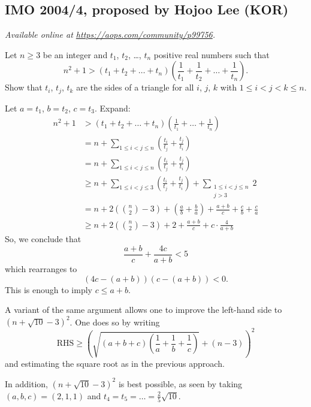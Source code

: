 \documentclass[11pt]{scrartcl}
\begin{document}
\subsection{IMO 2004/4, proposed by Hojoo Lee (KOR)}
\textsl{Available online at \url{https://aops.com/community/p99756}.}
\begin{mdframed}[style=mdpurplebox,frametitle={Problem statement}]
Let $n \ge 3$ be an integer
and $t_1$, $t_2$, \dots, $t_n$ positive real numbers such that
\[ n^2+1 > \left(t_1 + t_2 + \dots + t_n\right)
  \left( \frac{1}{t_1} + \frac{1}{t_2} + \dots + \frac{1}{t_n} \right). \]
Show that $t_i$, $t_j$, $t_k$ are the sides of a triangle
for all $i$, $j$, $k$ with $1 \le i < j < k \le n$.
\end{mdframed}
Let $a = t_1$, $b = t_2$, $c = t_3$.
Expand:
\begin{align*}
  n^2+1 &> \left(t_1 + t_2 + \dots + t_n\right)
    \left( \frac{1}{t_1} + \dots + \frac{1}{t_n} \right) \\
  &= n + \sum_{1 \le i < j \le n}
    \left( \frac{t_i}{t_j} + \frac{t_j}{t_i} \right) \\
  &= n + \sum_{1 \le i < j \le n}
    \left( \frac{t_i}{t_j} + \frac{t_j}{t_i} \right) \\
  &\ge n + \sum_{1 \le i < j \le 3}
    \left( \frac{t_i}{t_j} + \frac{t_j}{t_i} \right)
    + \sum_{\substack{1 \le i < j \le n \\ j > 3 }} 2 \\
  &= n + 2\left( \binom n2-3 \right)
    + \left( \frac ab + \frac ba \right)
    + \frac{a+b}{c} + \frac{c}{b} + \frac{c}{a} \\
  &\ge n + 2\left( \binom n2-3 \right) + 2
    + \frac{a+b}{c} + c \cdot \frac{4}{a+b}
\end{align*}
So, we conclude that
\[ \frac{a+b}{c} + \frac{4c}{a+b} < 5 \]
which rearranges to
\[ \left( 4c-(a+b) \right)\left( c-(a+b) \right) < 0. \]
This is enough to imply $c \le a+b$.

\begin{remark*}
  A variant of the same argument allows one to improve
  the left-hand side to $(n+\sqrt{10}-3)^2$.
  One does so by writing
  \[ \text{RHS} \ge \left( \sqrt{\left( a+b+c \right)
    \left( \frac1a+\frac1b+\frac1c \right)} + (n-3) \right)^2 \]
  and estimating the square root as in the previous approach.

  In addition, $(n+\sqrt{10}-3)^2$ is best possible,
  as seen by taking $(a,b,c) = (2,1,1)$ and $t_4 = t_5 = \dots = \frac25 \sqrt{10}$.
\end{remark*}
\pagebreak
\end{document}
